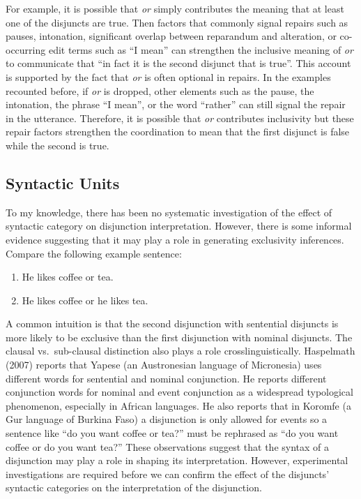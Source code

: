 \documentclass[oneside]{report}
\theoremstyle{definition}
\theoremstyle{definition}
\theoremstyle{definition}
\theoremstyle{remark}
\begin{document}
For example, it is possible that \emph{or} simply contributes the
meaning that at least one of the disjuncts are true. Then factors that
commonly signal repairs such as pauses, intonation, significant overlap
between reparandum and alteration, or co-occurring edit terms such as
``I mean'' can strengthen the inclusive meaning of \emph{or} to
communicate that ``in fact it is the second disjunct that is true''.
This account is supported by the fact that \emph{or} is often optional
in repairs. In the examples recounted before, if \emph{or} is dropped,
other elements such as the pause, the intonation, the phrase ``I mean'',
or the word ``rather'' can still signal the repair in the utterance.
Therefore, it is possible that \emph{or} contributes inclusivity but
these repair factors strengthen the coordination to mean that the first
disjunct is false while the second is true.

\subsection{Syntactic Units}\label{syntactic-units}

To my knowledge, there has been no systematic investigation of the
effect of syntactic category on disjunction interpretation. However,
there is some informal evidence suggesting that it may play a role in
generating exclusivity inferences. Compare the following example
sentence:
\begin{enumerate}
\def\labelenumi{(\arabic{enumi})}
\setcounter{enumi}{15}
\tightlist
\item
  He likes coffee or tea.
\item
  He likes coffee or he likes tea.
\end{enumerate}
A common intuition is that the second disjunction with sentential
disjuncts is more likely to be exclusive than the first disjunction with
nominal disjuncts. The clausal vs.~sub-clausal distinction also plays a
role crosslinguistically. Haspelmath (2007) reports that Yapese (an
Austronesian language of Micronesia) uses different words for sentential
and nominal conjunction. He reports different conjunction words for
nominal and event conjunction as a widespread typological phenomenon,
especially in African languages. He also reports that in Koromfe (a Gur
language of Burkina Faso) a disjunction is only allowed for events so a
sentence like ``do you want coffee or tea?'' must be rephrased as ``do
you want coffee or do you want tea?'' These observations suggest that
the syntax of a disjunction may play a role in shaping its
interpretation. However, experimental investigations are required before
we can confirm the effect of the disjuncts' syntactic categories on the
interpretation of the disjunction.
\end{document}
